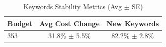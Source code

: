 \begin{table}[htbp]
\centering
\caption{Keywords Stability Metrics (Avg $\pm$ SE)}
\begin{tabular}{lcc}
\toprule
Budget & Avg Cost Change & New Keywords \\
\midrule
353 & 31.8\% $\pm$ 5.5\% & 82.2\% $\pm$ 2.8\% \\
\bottomrule
\end{tabular}
\end{table}